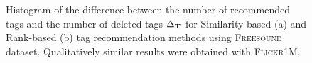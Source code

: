 \begin{figure}[t]
  \centering
  \caption[Histogram of the difference between the number of recommended tags and the number of deleted tags]{Histogram of the difference between the number of recommended tags and the number of deleted tags $\Delta_{\mathbf{T}}$ for Similarity-based (a) and Rank-based (b) tag recommendation methods using \textsc{Freesound} dataset. Qualitatively similar results were obtained with \textsc{Flickr1M}.}
  \label{general:fig:hist}
\end{figure}

